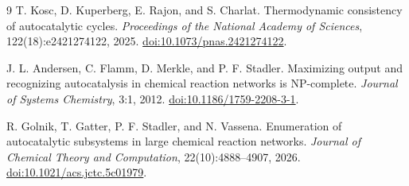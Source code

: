 \documentclass[11pt,a4paper]{article}
\begin{document}
\begin{thebibliography}{9}
T. Kosc, D. Kuperberg, E. Rajon, and S. Charlat.
Thermodynamic consistency of autocatalytic cycles.
\emph{Proceedings of the National Academy of Sciences},
122(18):e2421274122, 2025.
\href{https://doi.org/10.1073/pnas.2421274122}{doi:10.1073/pnas.2421274122}.

J. L. Andersen, C. Flamm, D. Merkle, and P. F. Stadler.
Maximizing output and recognizing autocatalysis in chemical reaction
networks is NP-complete.
\emph{Journal of Systems Chemistry}, 3:1, 2012.
\href{https://doi.org/10.1186/1759-2208-3-1}{doi:10.1186/1759-2208-3-1}.

R. Golnik, T. Gatter, P. F. Stadler, and N. Vassena.
Enumeration of autocatalytic subsystems in large chemical reaction networks.
\emph{Journal of Chemical Theory and Computation}, 22(10):4888--4907, 2026.
\href{https://doi.org/10.1021/acs.jctc.5c01979}{doi:10.1021/acs.jctc.5c01979}.
\end{thebibliography}
\end{document}
